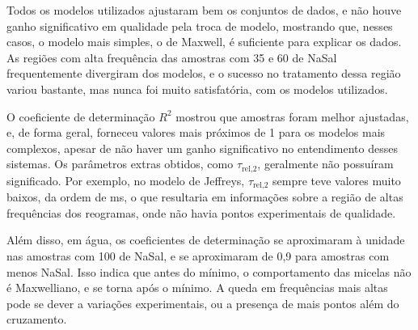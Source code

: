 		Todos os modelos utilizados ajustaram bem os conjuntos de dados, e não houve ganho significativo em qualidade pela troca de modelo, mostrando que, nesses casos, o modelo mais simples, o de Maxwell, é suficiente para explicar os dados. As regiões com alta frequência das amostras com 35 e 60 \mM{} de NaSal frequentemente divergiram dos modelos, e o sucesso no tratamento dessa região variou bastante, mas nunca foi muito satisfatória, com os modelos utilizados.
		
		O coeficiente de determinação \(R^2\) mostrou que amostras foram melhor ajustadas, e, de forma geral, forneceu valores mais próximos de 1 para os modelos mais complexos, apesar de não haver um ganho significativo no entendimento desses sistemas. Os parâmetros extras obtidos, como \(\tau_{\textrm{rel,2}}\), geralmente não possuíram significado. Por exemplo, no modelo de Jeffreys, \(\tau_{\textrm{rel,2}}\) sempre teve valores muito baixos, da ordem de ms, o que resultaria em informações sobre a região de altas frequências dos reogramas, onde não havia pontos experimentais de qualidade.
		
		Além disso, em água, os coeficientes de determinação se aproximaram à unidade nas amostras com 100 \mM{} de NaSal, e se aproximaram de 0,9 para amostras com menos NaSal. Isso indica que antes do mínimo, o comportamento das micelas não é Maxwelliano, e se torna após o mínimo. A queda em frequências mais altas pode se dever a variações experimentais, ou a presença de mais pontos além do cruzamento.


\FloatBarrier
